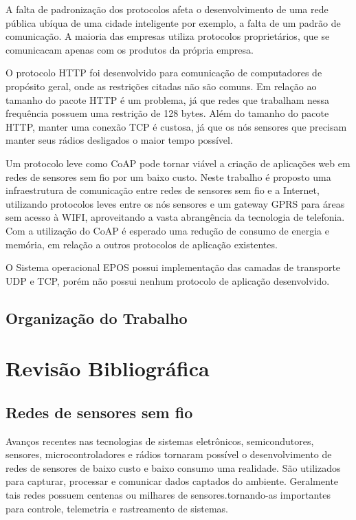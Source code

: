 A falta de padronização dos protocolos afeta o desenvolvimento de uma rede pública ub\'iqua de uma cidade inteligente por exemplo, a falta de um padrão de comunicação. A maioria das empresas utiliza protocolos propriet\'arios, que se comunicacam apenas com os produtos da pr\'opria empresa.

O protocolo HTTP foi desenvolvido para comunicação de computadores de prop\'osito geral, onde as restriç\~oes citadas não são comuns. Em relação ao tamanho do pacote HTTP \'e um problema, j\'a que redes que trabalham nessa frequência possuem uma restrição de 128 bytes.  Al\'em do tamanho do pacote HTTP, manter uma conexão TCP \'e custosa, j\'a que os n\'os sensores que precisam manter seus r\'adios desligados o maior tempo poss\'ivel.

Um protocolo leve como CoAP pode tornar vi\'avel a criação de aplicaç\~oes web em redes de sensores sem fio por um baixo custo. Neste trabalho \'e proposto uma infraestrutura de comunicação entre redes de sensores sem fio e a Internet, utilizando protocolos leves entre os n\'os sensores e um gateway GPRS para \'areas sem acesso à WIFI, aproveitando a vasta abrangência da tecnologia de telefonia. Com a utilização do CoAP \'e esperado uma redução de consumo de energia e mem\'oria, em relação a outros protocolos de aplicação existentes.

O Sistema operacional EPOS possui implementação das camadas de transporte UDP e TCP, por\'em não possui nenhum protocolo de aplicação desenvolvido.

\subsection{Organização do Trabalho}

\section{Revisão Bibliogr\'afica}

\subsection{Redes de sensores sem fio}
Avanços recentes nas tecnologias de sistemas eletrônicos, semicondutores, sensores, microcontroladores e r\'adios tornaram poss\'ivel o desenvolvimento de redes de sensores de baixo custo e baixo consumo uma realidade. São utilizados para capturar, processar e comunicar dados captados do ambiente. Geralmente tais redes possuem centenas ou milhares de sensores.tornando-as importantes para controle, telemetria e rastreamento de sistemas.

